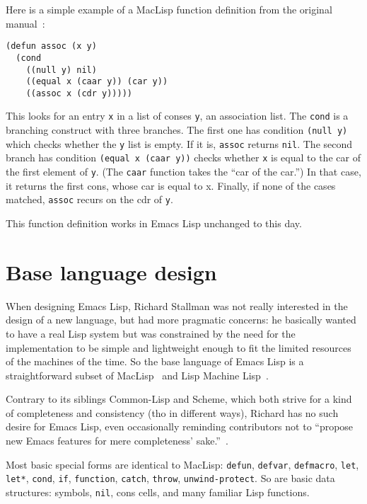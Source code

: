 \documentclass[format=acmsmall, review]{acmart}
\newcommand \Elisp {Emacs Lisp}
\begin{document}
%
Here is a simple example of a MacLisp function definition from the
original manual~\cite{Moon1974}:
%
\begin{verbatim}
(defun assoc (x y)
  (cond
    ((null y) nil)
    ((equal x (caar y)) (car y))
    ((assoc x (cdr y)))))
\end{verbatim}
%
This looks for an entry \texttt{x} in a list of conses \texttt{y}, an
association list.  The \texttt{cond} is a branching construct with
three branches.  The first one has condition \texttt{(null y)} which
checks whether the \texttt{y} list is empty.  If it is, \texttt{assoc}
returns \texttt{nil}.  The second branch has condition \texttt{(equal
  x (caar y))} checks whether \texttt{x} is equal to the car of the
first element of \texttt{y}.  (The \texttt{caar} function takes the
``car of the car.'')  In that case, it returns the first cons, whose
car is equal to x.  Finally, if none of the cases matched,
\texttt{assoc} recurs on the cdr of \texttt{y}.

This function definition works in \Elisp{} unchanged to this day.

\section{Base language design}
\label{sec:base-language-design}

When designing \Elisp{}, Richard Stallman was not really interested in the
design of a new language, but had more pragmatic concerns: he basically
wanted to have a real Lisp system but was constrained by the need for the
implementation to be simple and lightweight enough to fit the limited
resources of the machines of the time.  So the base language of \Elisp{} is
a straightforward subset of MacLisp~\cite{Moon1974,Pitman1983} and Lisp
Machine Lisp~\cite{WeinrebMoon1981}.

Contrary to its siblings Common-Lisp and Scheme, which both strive for
a kind of completeness and consistency (tho in different ways), Richard has
no such desire for \Elisp, even occasionally reminding contributors
not to ``propose new Emacs features for mere completeness'
sake.''~\cite{RMS-completeness}.

Most basic special forms are identical to MacLisp: \texttt{defun},
\texttt{defvar}, \texttt{defmacro}, \texttt{let}, \texttt{let*},
\texttt{cond}, \texttt{if}, \texttt{function}, \texttt{catch}, \texttt{throw},
\texttt{unwind-protect}.  So are basic data structures: symbols,
\texttt{nil}, cons cells, and many familiar Lisp functions.
\end{document}

